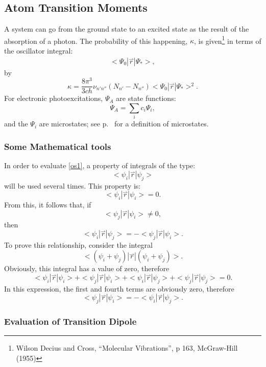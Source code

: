 \subsection{Atom Transition Moments}
\label{oscil}
A system can go from the ground state to an excited  state as the result of the
absorption of a photon.  The probability of this happening, $\kappa$, is
given\footnote{\samepage Wilson Decius and Cross,  ``Molecular Vibrations'', p
163, McGraw-Hill (1955)} in terms of the  oscillator integral:
\begin{eqnarray}
<\!\Psi_{0}|\stackrel{\rightharpoonup}{r}|\Psi_{*}\!> \label{os1},
\end{eqnarray}
by
$$
\kappa = \frac{8\pi^3}{3ch}\nu_{n'n''}(N_{n'}-N_{n''})
<\!\Psi_{0}|\stackrel{\rightharpoonup}{r}|\Psi_{*}\!>^2 .
$$
For electronic photoexcitations, $\Psi_A$ are state functions:
$$
\Psi_A = \sum_ic_i\Psi_i,
$$
and the $\Psi_i$ are microstates; see p.~\pageref{sd} for a
definition of microstates.
\subsubsection*{Some Mathematical tools}
In order to evaluate \ref{os1}, a property of integrals of the type:
$$
<\!\psi_{i}|\stackrel{\rightharpoonup}{r}|\psi_{j}\!>
$$
will be used several times.  This property is:
$$
<\!\psi_{i}|\stackrel{\rightharpoonup}{r}|\psi_{i}\!> = 0.
$$
From this, it follows that, if
$$
<\!\psi_{j}|\stackrel{\rightharpoonup}{r}|\psi_{i}\!> \neq 0,
$$
then
$$
<\!\psi_{i}|\stackrel{\rightharpoonup}{r}|\psi_{j}\!> =
-<\!\psi_{j}|\stackrel{\rightharpoonup}{r}|\psi_{i}\!> .
$$
To prove this relationship, consider the integral
$$
<\!(\psi_i+\psi_j)|\stackrel{\rightharpoonup}{r}|(\psi_i+\psi_j)\!>.
$$
Obviously, this integral has a value of zero, therefore
$$
<\!\psi_i|\stackrel{\rightharpoonup}{r}|\psi_i\!>  +
<\!\psi_j|\stackrel{\rightharpoonup}{r}|\psi_i\!>  +
<\!\psi_i|\stackrel{\rightharpoonup}{r}|\psi_j\!>  +
<\!\psi_j|\stackrel{\rightharpoonup}{r}|\psi_j\!>  =0.
$$
In this expression, the first and fourth terms are obviously zero, therefore
$$
<\!\psi_j|\stackrel{\rightharpoonup}{r}|\psi_i\!>  =
-<\!\psi_i|\stackrel{\rightharpoonup}{r}|\psi_j\!> .
$$

\subsubsection{Evaluation of Transition Dipole}

